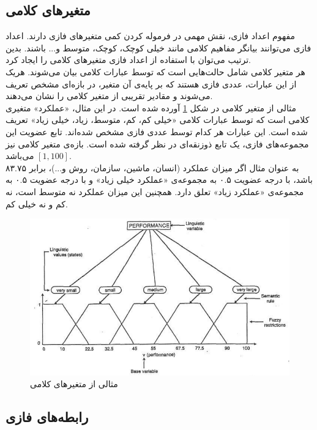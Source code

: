 \documentclass[12pt,a4paper]{article}
\theoremstyle{definition}
\begin{document}
  \subsection{‌متغیرهای کلامی}
  مفهوم اعداد فازی، نقش مهمی در فرموله کردن کمی متغیرهای فازی دارند. اعداد فازی می‌توانند بیانگر مفاهیم کلامی مانند خیلی کوچک، کوچک، متوسط و... باشند. بدین ترتیب می‌توان با استفاده از اعداد فازی متغیرهای کلامی
   را ایجاد کرد. \\
   هر متغیر کلامی شامل حالت‌هایی است که توسط عبارات کلامی
   بیان می‌شوند. هریک از این عبارات، عددی فازی هستند که بر پایه‌ی آن متغیر، در بازه‌ای مشخص تعریف می‌شوند و مقادیر تقریبی از متغیر کلامی را نشان می‌دهند. \\
   مثالی از متغیر کلامی در شکل
   \ref{fig:f_19}
   آورده شده است. در این مثال، «عملکرد»
   متغیری کلامی است که توسط عبارات کلامی «خیلی کم، کم، متوسط، زیاد، خیلی زیاد» تعریف شده است. این عبارات هر کدام توسط عددی فازی مشخص شده‌اند. تابع عضویت این مجموعه‌های فازی، یک تابع ذوزنقه‌ای در نظر گرفته شده است. بازه‌ی متغیر کلامی نیز $[1, 100]$ می‌باشد. 
     \cite{Klir1995}
   \\
   به عنوان مثال اگر میزان عملکرد (انسان، ماشین، سازمان، روش و...)، برابر ۸۳.۷۵ باشد، با درجه عضویت ۰.۵ به مجموعه‌ی «عملکرد خیلی زیاد» و با درجه‌ عضویت ۰.۵ به مجموعه‌ی «عملکرد زیاد» تعلق دارد. همچنین این میزان عملکرد نه متوسط است، نه کم و نه خیلی کم. 

  	\begin{figure}[h]
  	\centering 
  	\includegraphics[width=125mm]{Images/Fig19.png}
  	\vspace{-0.5cm}
  	\caption{مثالی از متغیرهای کلامی}\label{fig:f_19}
  \end{figure}
 \subsection{رابطه‌های فازی}
\end{document}

